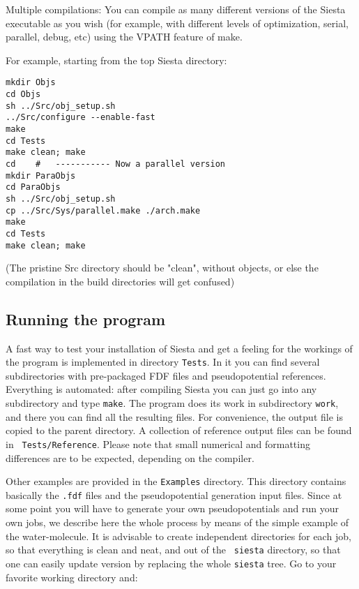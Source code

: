 \documentclass[11pt]{article}
\begin{document}
Multiple compilations: You can compile as many different versions of
the {\sc Siesta} executable as you wish (for example, with different
levels of optimization, serial, parallel, debug, etc) using the 
VPATH feature of make. 

For example, starting from the top Siesta directory:

\begin{verbatim}
mkdir Objs
cd Objs
sh ../Src/obj_setup.sh
../Src/configure --enable-fast
make
cd Tests
make clean; make
cd    #   ----------- Now a parallel version
mkdir ParaObjs
cd ParaObjs
sh ../Src/obj_setup.sh
cp ../Src/Sys/parallel.make ./arch.make
make
cd Tests
make clean; make
\end{verbatim}

(The pristine Src directory should be "clean", without objects, or else
the compilation in the build directories will get confused)


\subsection{Running the program}

A fast way to test your installation of {\sc Siesta} and get a feeling
for the workings of the program is implemented in directory
{\tt Tests}. In it you can find several subdirectories
with pre-packaged FDF files and pseudopotential references. Everything
is automated: after compiling {\sc Siesta} you can just go into any
subdirectory and type {\tt make}. The program does its work in
subdirectory {\tt work}, and there you can find all the resulting
files. For convenience, the output file is copied to the parent
directory. A collection of reference output files can be found in {\tt
  Tests/Reference}. Please note that small numerical and
formatting differences are to be expected, depending on the compiler.

Other examples are provided in the {\tt Examples} directory. This
directory contains basically the {\tt .fdf} files and the
pseudopotential generation input files. Since at some point you will
have to generate your own pseudopotentials and run your own jobs, we
describe here the whole process by means of the simple example of the
water-molecule. It is advisable to create independent directories for
each job, so that everything is clean and neat, and out of the {\tt
siesta} directory, so that one can easily update version by replacing
the whole {\tt siesta} tree. Go to your favorite working directory
and:
\end{document}
